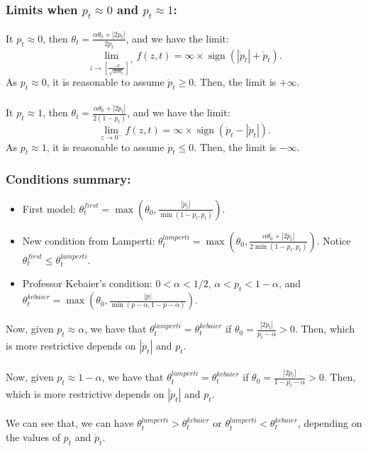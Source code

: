 \documentclass[aspectratio=169]{beamer}\usepackage[utf8]{inputenc}
\DeclareMathOperator{\sign}{sign}
\begin{document}
\begin{frame}\frametitle{Limits when $p_t\approx0$ and $p_t\approx1$:}

It $p_t\approx0$, then $\theta_t=\frac{\alpha\theta_0+|2\dot{p}_t|}{2p_t}$, and we have the limit: $$\lim_{z\to\left[\frac{-\pi}{\sqrt{2\alpha\theta_0}}\right]^+}f(z,t)=\infty\times\sign(|\dot{p}_t|+\dot{p}_t).$$
As $p_t\approx0$, it is reasonable to assume $\dot{p}_t\geq0$. Then, the limit is $+\infty$.\\
\quad\\
It $p_t\approx1$, then $\theta_t=\frac{\alpha\theta_0+|2\dot{p}_t|}{2(1-p_t)}$, and we have the limit: $$\lim_{z\to0^-}f(z,t)=\infty\times\sign(\dot{p}_t-|\dot{p}_t|).$$
As $p_t\approx1$, it is reasonable to assume $\dot{p}_t\leq0$. Then, the limit is $-\infty$.

\end{frame}


\begin{frame}\frametitle{Conditions summary:}

\begin{itemize}

\item First model: $\theta_t^{first}=\max\left(\theta_0,\frac{|\dot{p}_t|}{\min(1-p_t,p_t)}\right)$.
\item New condition from Lamperti: $\theta_t^{lamperti}=\max\left(\theta_0,\frac{\alpha\theta_0+|2\dot{p}_t|}{2\min(1-p_t,p_t)}\right)$. Notice $\theta_t^{first}\leq\theta_t^{lamperti}$.
\item Professor Kebaier's condition: $0<\alpha<1/2$, $\alpha<p_t<1-\alpha$, and $\theta_t^{kebaier}=\max\left(\theta_0,\frac{|\dot{p}|}{\min(p-\alpha,1-p-\alpha)}\right)$.

\end{itemize}
Now, given $p_t\approx\alpha$, we have that $\theta_t^{lamperti}=\theta_t^{kebaier}$ if $\theta_0=\frac{|2\dot{p}_t|}{p_t-\alpha}>0$. Then, which is more restrictive depends on $|\dot{p}_t|$ and $p_t$.\\
\quad\\
Now, given $p_t\approx1-\alpha$, we have that $\theta_t^{lamperti}=\theta_t^{kebaier}$ if $\theta_0=\frac{|2\dot{p}_t|}{1-p_t-\alpha}>0$. Then, which is more restrictive depends on $|\dot{p}_t|$ and $p_t$.\\
\quad\\
\alert{We can see that, we can have $\theta_t^{lamperti}>\theta_t^{kebaier}$ or $\theta_t^{lamperti}<\theta_t^{kebaier}$, depending on the values of $p_t$ and $\dot{p}_t$.}
\end{frame}
\end{document}
